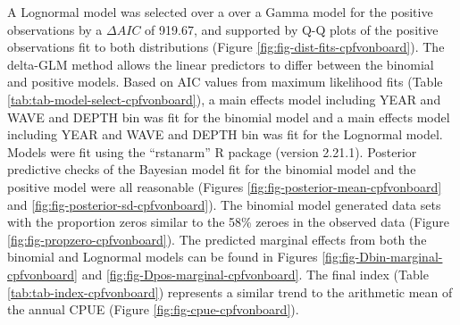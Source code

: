\documentclass[11pt,
  english,
]{article}
\begin{document}
A Lognormal model was selected over a over a Gamma model for the positive observations by a {\(\Delta AIC\)\leavevmode\tagmcend\tagstructend} of 919.67, and supported by Q-Q plots of the positive observations fit to both distributions (Figure \ref{fig:fig-dist-fits-cpfvonboard}). The delta-GLM method allows the linear predictors to differ between the binomial and positive models. Based on AIC values from maximum likelihood fits (Table \ref{tab:tab-model-select-cpfvonboard}), a main effects model including YEAR and WAVE and DEPTH bin was fit for the binomial model and a main effects model including YEAR and WAVE and DEPTH bin was fit for the Lognormal model. Models were fit using the ``rstanarm'' R package (version 2.21.1). Posterior predictive checks of the Bayesian model fit for the binomial model and the positive model were all reasonable (Figures \ref{fig:fig-posterior-mean-cpfvonboard} and \ref{fig:fig-posterior-sd-cpfvonboard}). The binomial model generated data sets with the proportion zeros similar to the 58\% zeroes in the observed data (Figure \ref{fig:fig-propzero-cpfvonboard}). The predicted marginal effects from both the binomial and Lognormal models can be found in Figures \ref{fig:fig-Dbin-marginal-cpfvonboard} and \ref{fig:fig-Dpos-marginal-cpfvonboard}. The final index (Table \ref{tab:tab-index-cpfvonboard}) represents a similar trend to the arithmetic mean of the annual CPUE (Figure \ref{fig:fig-cpue-cpfvonboard}).

\FloatBarrier
\end{document}
